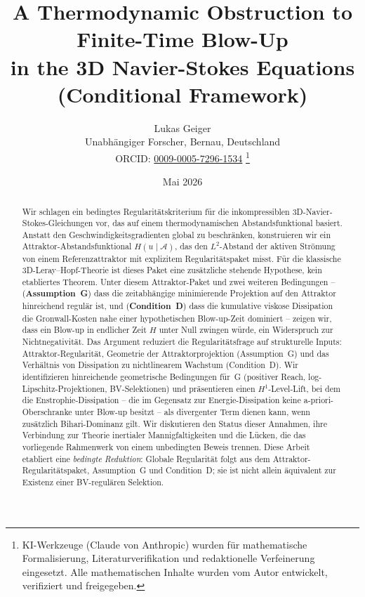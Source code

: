 \documentclass[12pt,a4paper]{article}
\title{\textbf{A Thermodynamic Obstruction to Finite-Time Blow-Up\\ in the 3D Navier-Stokes Equations (Conditional Framework)}}
\author{Lukas Geiger\\
\small Unabhängiger Forscher, Bernau, Deutschland\\
\small ORCID: \href{https://orcid.org/0009-0005-7296-1534}{0009-0005-7296-1534}%
\thanks{KI-Werkzeuge (Claude von Anthropic) wurden f\"ur mathematische Formalisierung, Literaturverifikation und redaktionelle Verfeinerung eingesetzt. Alle mathematischen Inhalte wurden vom Autor entwickelt, verifiziert und freigegeben.}}
\date{Mai 2026}
\theoremstyle{definition}
\theoremstyle{plain}
\theoremstyle{remark}
\begin{document}
\maketitle

\begin{abstract}
Wir schlagen ein bedingtes Regularitätskriterium für die inkompressiblen 3D-Navier-Stokes-Gleichungen vor, das auf einem thermodynamischen Abstandsfunktional basiert. Anstatt den Geschwindigkeitsgradienten global zu beschränken, konstruieren wir ein Attraktor-Abstandsfunktional $H(u \mid \mathcal{A})$, das den $L^2$-Abstand der aktiven Strömung von einem Referenzattraktor mit explizitem Regularitätspaket misst. Für die klassische 3D-Leray--Hopf-Theorie ist dieses Paket eine zusätzliche stehende Hypothese, kein etabliertes Theorem. Unter diesem Attraktor-Paket und zwei weiteren Bedingungen -- (\textbf{Assumption~G}) dass die zeitabhängige minimierende Projektion auf den Attraktor hinreichend regulär ist, und (\textbf{Condition~D}) dass die kumulative viskose Dissipation die Gronwall-Kosten nahe einer hypothetischen Blow-up-Zeit dominiert -- zeigen wir, dass ein Blow-up in endlicher Zeit $H$ unter Null zwingen würde, ein Widerspruch zur Nichtnegativität. Das Argument reduziert die Regularitätsfrage auf strukturelle Inputs: Attraktor-Regularität, Geometrie der Attraktorprojektion (Assumption~G) und das Verhältnis von Dissipation zu nichtlinearem Wachstum (Condition~D). Wir identifizieren hinreichende geometrische Bedingungen für~G (positiver Reach, log-Lipschitz-Projektionen, BV-Selektionen) und präsentieren einen $H^1$-Level-Lift, bei dem die Enstrophie-Dissipation -- die im Gegensatz zur Energie-Dissipation keine a-priori-Oberschranke unter Blow-up besitzt -- als divergenter Term dienen kann, wenn zusätzlich Bihari-Dominanz gilt. Wir diskutieren den Status dieser Annahmen, ihre Verbindung zur Theorie inertialer Mannigfaltigkeiten und die Lücken, die das vorliegende Rahmenwerk von einem unbedingten Beweis trennen.
Diese Arbeit etabliert eine \emph{bedingte Reduktion}: Globale Regularität folgt aus dem Attraktor-Regularitätspaket, Assumption~G und Condition~D; sie ist nicht allein äquivalent zur Existenz einer BV-regulären Selektion.
\end{abstract}

\clearpage
\tableofcontents
\clearpage
\end{document}
